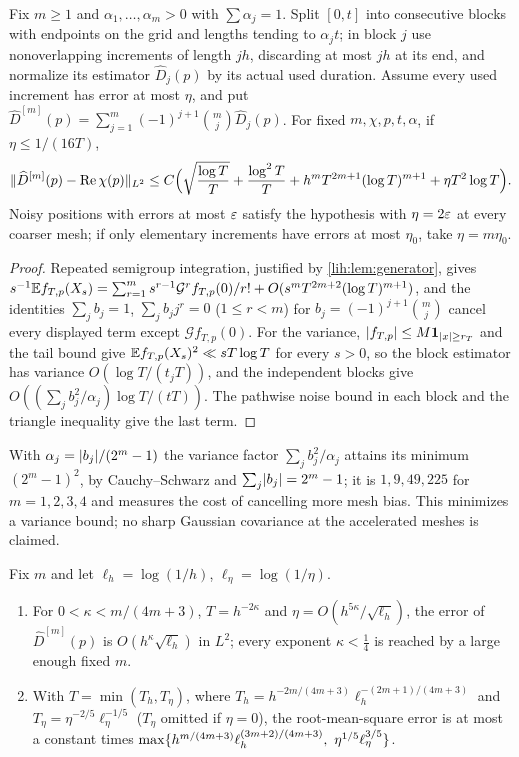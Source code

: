 \begin{theorem}\label{lih:thm:extrapolation}
Fix $m\ge1$ and $\alpha_1,\dots,\alpha_m>0$ with $\sum\alpha_j=1$. Split $[0,t]$ into consecutive blocks with endpoints on
the grid and lengths tending to $\alpha_jt$; in block $j$ use nonoverlapping increments of length $jh$, discarding
at most $jh$ at its end, and normalize its estimator $\widehat D_j(p)$ by its actual used duration. Assume every used
increment has error at most $\eta$, and put $\widehat D^{[m]}(p)=\sum_{j=1}^m(-1)^{j+1}\binom mj\widehat D_j(p)$. For fixed
$m,\chi,p,t,\alpha$, if $\eta\le1/(16T)$,
\[
 \lVert\widehat D^{[m]}(p)-\operatorname{Re}\chi(p)\rVert_{L^2}\le C\Bigl(\sqrt{\frac{\log T}T}+\frac{\log^2T}T+h^mT^{2m+1}(\log T)^{m+1}+\eta T^2\log T\Bigr).
\]
Noisy positions with errors at most $\varepsilon$ satisfy the hypothesis with $\eta=2\varepsilon$ at every coarser mesh;
if only elementary increments have errors at most $\eta_0$, take $\eta=m\eta_0$.
\end{theorem}

\begin{proof}
Repeated semigroup integration, justified by \cref{lih:lem:generator}, gives
$s^{-1}\mathbb{E} f_{T,p}(X_s)=\sum_{r=1}^ms^{r-1}\mathcal G^rf_{T,p}(0)/r!+O(s^mT^{2m+2}(\log T)^{m+1})$, and the identities
$\sum_jb_j=1$, $\sum_jb_jj^r=0$ ($1\le r<m$) for $b_j=(-1)^{j+1}\binom mj$ cancel every displayed term except
$\mathcal Gf_{T,p}(0)$. For the variance, $\lvert f_{T,p}\rvert\le M\mathbf 1_{\lvert x\rvert\ge r_T}$ and the tail bound give
$\mathbb{E} f_{T,p}(X_s)^2\ll sT\log T$ for every $s>0$, so the block estimator has variance $O(\log T/(t_jT))$, and the
independent blocks give $O((\sum_jb_j^2/\alpha_j)\log T/(tT))$. The pathwise noise bound in each block and the
triangle inequality give the last term.
\end{proof}

With $\alpha_j=\lvert b_j\rvert/(2^m-1)$ the variance factor $\sum_jb_j^2/\alpha_j$ attains its minimum $(2^m-1)^2$, by Cauchy--Schwarz
and $\sum_j\lvert b_j\rvert=2^m-1$; it is $1,9,49,225$ for $m=1,2,3,4$ and measures the cost of cancelling more mesh bias.
This minimizes a variance bound; no sharp Gaussian covariance at the accelerated meshes is claimed.

\begin{corollary}\label{lih:cor:noisyrates}
Fix $m$ and let $\ell_h=\log(1/h)$, $\ell_\eta=\log(1/\eta)$.
\begin{enumerate}[label=\textup{(\roman*)}]
\item For $0<\kappa<m/(4m+3)$, $T=h^{-2\kappa}$ and $\eta=O(h^{5\kappa}/\sqrt{\ell_h})$, the error of $\widehat D^{[m]}(p)$ is
$O(h^\kappa\sqrt{\ell_h})$ in $L^2$; every exponent $\kappa<\frac14$ is reached by a large enough fixed $m$.
\item With $T=\min(T_h,T_\eta)$, where $T_h=h^{-2m/(4m+3)}\ell_h^{-(2m+1)/(4m+3)}$ and $T_\eta=\eta^{-2/5}\ell_\eta^{-1/5}$ ($T_\eta$ omitted if
$\eta=0$), the root-mean-square error is at most a constant times
$\max\set{h^{m/(4m+3)}\ell_h^{(3m+2)/(4m+3)},\ \eta^{1/5}\ell_\eta^{3/5}}$.
\end{enumerate}
\end{corollary}

